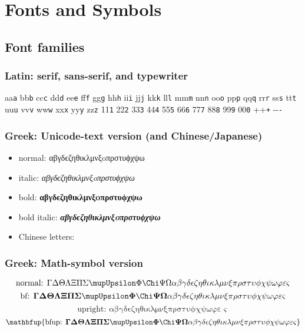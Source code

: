 \documentclass[11pt,pdfx]{MishoText}
\begin{document}
\chapter{Fonts and Symbols}

\section{Font families}
\subsection{Latin: serif, sans-serif, and typewriter}

\def\w#1{#1\textsf{#1}\texttt{#1} }
\w a\w b\w c\w d\w e\w f\w g\w h\w i\w j\w k\w l\w m\w n\w o\w p\w q\w r\w s\w t\w u\w v\w w\w x\w y\w z\w 1\w 2\w 3\w 4\w 5\w 6\w 7\w 8\w 9\w0 \w+\w-

\subsection{Greek: Unicode-text version (and Chinese/Japanese)}
\begin{itemize}
  \item normal: αβγδϵζηθικλμνξoπρστυϕχψω
  \item italic: \textit{αβγδϵζηθικλμνξoπρστυϕχψω}
  \item bold: \textbf{αβγδϵζηθικλμνξoπρστυϕχψω}
  \item bold italic: \textbf{\textit{αβγδϵζηθικλμνξoπρστυϕχψω}}
  \item Chinese letters: \endjapanese
\end{itemize}

\subsection{Greek: Math-symbol version}
\[
  \text{normal: }\Gamma \Delta \Theta \Lambda \Xi \Pi \Sigma \Upsilon \Phi \Chi \Psi \Omega
  \alpha \beta \gamma \delta \epsilon \zeta \eta \theta \iota \kappa \lambda \mu \nu \xi \pi \rho \sigma \tau \upsilon \phi \chi \psi \omega
  \varphi\varepsilon\varsigma
\]
\[\mathbf{
  \text{bf: }
  \Gamma \Delta \Theta \Lambda \Xi \Pi \Sigma \Upsilon \Phi \Chi \Psi \Omega
  \alpha \beta \gamma \delta \epsilon \zeta \eta \theta \iota \kappa \lambda \mu \nu \xi \pi \rho \sigma \tau \upsilon \phi \chi \psi \omega
  \varphi\varepsilon\varsigma
}\]
\[\mathup{
  \text{upright: }
  \alpha \beta \gamma \delta \epsilon \zeta \eta \theta \iota \kappa \lambda \mu \nu \xi \pi \rho \sigma \tau \upsilon \phi \chi \psi \omega
  \varphi\varepsilon\varsigma
}\]
\[\mathbf{\mathbfup{
  \text{bfup: }
  \Gamma \Delta \Theta \Lambda \Xi \Pi \Sigma \Upsilon \Phi \Chi \Psi \Omega
  \alpha \beta \gamma \delta \epsilon \zeta \eta \theta \iota \kappa \lambda \mu \nu \xi \pi \rho \sigma \tau \upsilon \phi \chi \psi \omega
  \varphi\varepsilon\varsigma
}}\]
\end{document}
